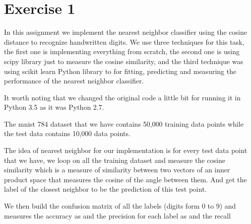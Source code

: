 \section*{Exercise 1}
In this assignment we implement the nearest neighbor classifier using the cosine distance to recognize handwritten digits. 
We use three techniques for this task, the first one is implementing everything from scratch, the second one is using scipy library just to measure the cosine similarity, and the third technique was using scikit learn Python library to for fitting, predicting and measuring the performance of the nearest neighbor classifier.

It worth noting that we changed the original code a little bit for running it in Python 3.5 as it was Python 2.7. 

The mnist 784 dataset that we have contains 50,000 training data points while the test data contains 10,000 data points.

The idea of nearest neighbor for our implementation is for every 
test data point that we have, we loop on all the training dataset and measure the cosine similarity which is a measure of similarity between two 
vectors of an inner product space that measures the cosine of the 
angle between them. And get the label of the closest neighbor to be the prediction of this test point.

We then build the confusion matrix of all the labels (digits form 0 to 9) and measures the accuracy as 
and the precision for each label as
and the recall  
 
